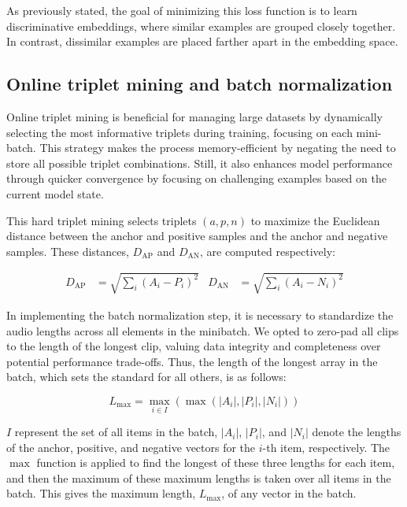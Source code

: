 As previously stated, the goal of minimizing this loss function is to learn discriminative embeddings, where similar examples are grouped closely together. In contrast, dissimilar examples are placed farther apart in the embedding space.

\subsection{Online triplet mining and batch normalization}

Online triplet mining is beneficial for managing large datasets by dynamically selecting the most informative triplets during training, focusing on each mini-batch. This strategy makes the process memory-efficient by negating the need to store all possible triplet combinations. Still, it also enhances model performance through quicker convergence by focusing on challenging examples based on the current model state.

This hard triplet mining selects triplets $(a, p, n)$ to maximize the Euclidean distance between the anchor and positive samples and the anchor and negative samples. These distances, $D_{\text{AP}}$ and $D_{\text{AN}}$, are computed respectively:


\begin{align}
D_{\text{AP}} &= \sqrt{\sum_{i} (A_i - P_i)^2} & D_{\text{AN}} &= \sqrt{\sum_{i} (A_i - N_i)^2}
\end{align}


In implementing the batch normalization step, it is necessary to standardize the audio lengths across all elements in the minibatch. We opted to zero-pad all clips to the length of the longest clip, valuing data integrity and completeness over potential performance trade-offs. Thus, the length of the longest array in the batch, which sets the standard for all others, is as follows:

\begin{equation}
L_{\text{max}} = \max_{i \in I} \left( \max \left( |A_i|, |P_i|, |N_i| \right) \right)
\end{equation}

$I$ represent the set of all items in the batch, $|A_i|$, $|P_i|$, and $|N_i|$ denote the lengths of the anchor, positive, and negative vectors for the $i$-th item, respectively. The $\max$ function is applied to find the longest of these three lengths for each item, and then the maximum of these maximum lengths is taken over all items in the batch. This gives the maximum length, $L_{\text{max}}$, of any vector in the batch.

